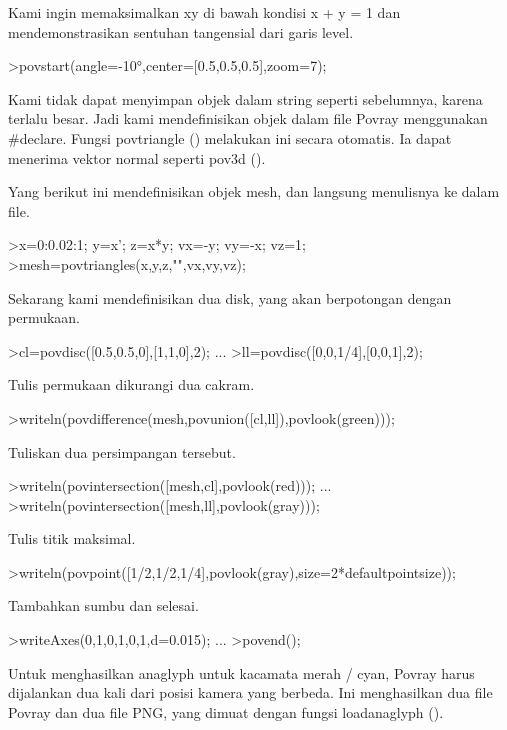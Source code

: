 \documentclass[a4paper,10pt]{article}
\begin{document}
\begin{eulernotebook}
\begin{eulercomment}
\begin{eulercomment}
\begin{eulercomment}
Kami ingin memaksimalkan xy di bawah kondisi x + y = 1 dan
mendemonstrasikan sentuhan tangensial dari garis level.
\end{eulercomment}
\begin{eulerprompt}
>povstart(angle=-10°,center=[0.5,0.5,0.5],zoom=7);
\end{eulerprompt}
\begin{eulercomment}
Kami tidak dapat menyimpan objek dalam string seperti sebelumnya,
karena terlalu besar. Jadi kami mendefinisikan objek dalam file Povray
menggunakan #declare. Fungsi povtriangle () melakukan ini secara
otomatis. Ia dapat menerima vektor normal seperti pov3d ().

Yang berikut ini mendefinisikan objek mesh, dan langsung menulisnya ke
dalam file.
\end{eulercomment}
\begin{eulerprompt}
>x=0:0.02:1; y=x'; z=x*y; vx=-y; vy=-x; vz=1;
>mesh=povtriangles(x,y,z,"",vx,vy,vz);
\end{eulerprompt}
\begin{eulercomment}
Sekarang kami mendefinisikan dua disk, yang akan berpotongan dengan
permukaan.
\end{eulercomment}
\begin{eulerprompt}
>cl=povdisc([0.5,0.5,0],[1,1,0],2); ...
>ll=povdisc([0,0,1/4],[0,0,1],2);
\end{eulerprompt}
\begin{eulercomment}
Tulis permukaan dikurangi dua cakram.
\end{eulercomment}
\begin{eulerprompt}
>writeln(povdifference(mesh,povunion([cl,ll]),povlook(green)));
\end{eulerprompt}
\begin{eulercomment}
Tuliskan dua persimpangan tersebut.
\end{eulercomment}
\begin{eulerprompt}
>writeln(povintersection([mesh,cl],povlook(red))); ...
>writeln(povintersection([mesh,ll],povlook(gray)));
\end{eulerprompt}
\begin{eulercomment}
Tulis titik maksimal.
\end{eulercomment}
\begin{eulerprompt}
>writeln(povpoint([1/2,1/2,1/4],povlook(gray),size=2*defaultpointsize));
\end{eulerprompt}
\begin{eulercomment}
Tambahkan sumbu dan selesai.
\end{eulercomment}
\begin{eulerprompt}
>writeAxes(0,1,0,1,0,1,d=0.015); ...
>povend();
\end{eulerprompt}
\begin{eulercomment}
Untuk menghasilkan anaglyph untuk kacamata merah / cyan, Povray harus
dijalankan dua kali dari posisi kamera yang berbeda. Ini menghasilkan
dua file Povray dan dua file PNG, yang dimuat dengan fungsi
loadanaglyph ().


\end{eulercomment}
\end{eulercomment}
\end{eulercomment}
\end{eulernotebook}
\end{document}
